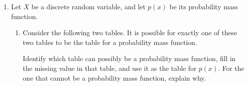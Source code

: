 \documentclass[11pt]{article}
\begin{document}
\begin{enumerate}
\begin{enumerate}
\begin{enumerate}
        {\color{blue}\textbf{Solution:}

        $\displaystyle\sum_{j=2}^4(j^2-2j)=(2^2-2\cdot 2)+(3^2-2\cdot 3)+(4^2-2\cdot 4)=0+3+8=11$
    
        }

        \vfill
    \end{enumerate}

    \item Write the following sum in summation notation. 

    \[\dfrac{2}{\ln(3)}+\dfrac{4}{\ln(4)}+\dfrac{8}{\ln(5)}+\dfrac{16}{\ln(6)}\]

    {\color{blue}\textbf{Solution:}

    $\displaystyle\sum_{i=3}^6\dfrac{2^{i-2}}{\ln(i)}$ or $\displaystyle\sum_{i=1}^4\dfrac{2^{i}}{\ln(i+2)}$ are two possible correct answers. Other correct answers exist.
    
    }

    \vfill
\end{enumerate}


\newpage


\item Let $X$ be a discrete random variable, and let $p(x)$ be its probability mass function.

\begin{enumerate}
    \item Consider the following two tables. It is possible for exactly one of these two tables to be the table for a probability mass function.

    Identify which table can possibly be a probability mass function, fill in the missing value in that table, and use it as the table for $p(x)$. For the one that cannot be a probability mass function, explain why. 

    \vspace{1cm}


\end{enumerate}
\end{enumerate}
\end{document}
